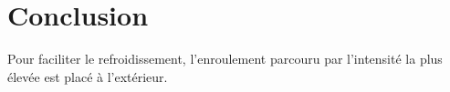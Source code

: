 \section{Conclusion}
Pour faciliter le refroidissement, l’enroulement parcouru par l’intensité la plus élevée est placé à l’extérieur.